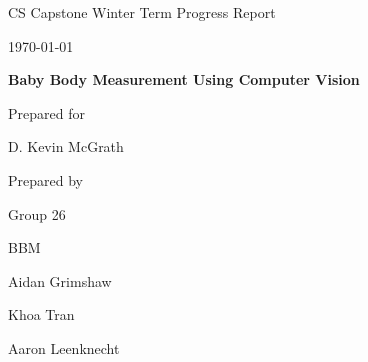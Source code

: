 \documentclass[onecolumn, draftclsnofoot,10pt, compsoc]{IEEEtran}
\def \CapstoneTeamName{		BBM}
\def \CapstoneTeamNumber{		26}
\def \GroupMemberOne{			Aidan Grimshaw}
\def \GroupMemberTwo{			Khoa Tran}
\def \GroupMemberThree{			Aaron Leenknecht}
\def \CapstoneProjectName{		Baby Body Measurement Using Computer Vision}
\def \CapstoneSponsorPerson{		D. Kevin McGrath}
\def \DocType{		%
				Winter Term Progress Report
				}
\newcommand{\NameSigPair}[1]{\par
\makebox[2.75in][r]{#1} \hfil 	\makebox[3.25in]{\makebox[2.25in]{\hrulefill} \hfill		\makebox[.75in]{\hrulefill}}
\par\vspace{-12pt} \textit{\tiny\noindent
\makebox[2.75in]{} \hfil		\makebox[3.25in]{\makebox[2.25in][r]{Signature} \hfill	\makebox[.75in][r]{Date}}}}
\renewcommand{\NameSigPair}[1]{#1}
\begin{document}
\begin{titlepage}
    \begin{singlespace}
        \hfill 
        \par\vspace{.2in}
        \centering
        \scshape{
            \huge CS Capstone \DocType \par
            {\large\today}\par
            \vspace{.5in}
            \textbf{\Huge\CapstoneProjectName}\par
            \vspace{10mm}
            {\large Prepared for}\par
            \vspace{5mm}
            {\Large\NameSigPair{\CapstoneSponsorPerson}\par}
            \vspace{5mm}
            {\large Prepared by }\par
            \vspace{5mm}
            Group\CapstoneTeamNumber\par
            \CapstoneTeamName\par 
            \vspace{5pt}
            {\Large
                
                \GroupMemberOne\par
                \GroupMemberTwo\par
                \GroupMemberThree\par
            }
            \vspace{.8in}
        }
        \begin{abstract}
            This document chronicles and details the team's progress by the end of Winter Term of 2020. It also briefly recaps the projects current state and what steps are left until completion.
        \end{abstract}     
    \end{singlespace}
\end{titlepage}
\newpage
{}
\tableofcontents
\clearpage
\end{document}
